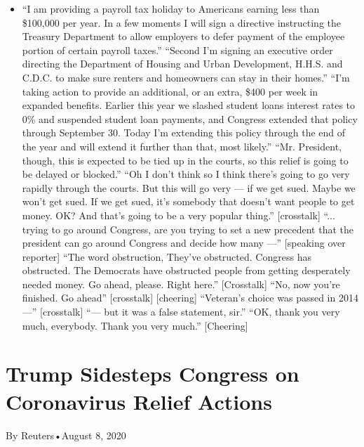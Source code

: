 \begin{itemize}
\tightlist
\item
  ``I am providing a payroll tax holiday to Americans earning less than
  \$100,000 per year. In a few moments I will sign a directive
  instructing the Treasury Department to allow employers to defer
  payment of the employee portion of certain payroll taxes.'' ``Second
  I'm signing an executive order directing the Department of Housing and
  Urban Development, H.H.S. and C.D.C. to make sure renters and
  homeowners can stay in their homes.'' ``I'm taking action to provide
  an additional, or an extra, \$400 per week in expanded benefits.
  Earlier this year we slashed student loans interest rates to 0\% and
  suspended student loan payments, and Congress extended that policy
  through September 30. Today I'm extending this policy through the end
  of the year and will extend it further than that, most likely.'' ``Mr.
  President, though, this is expected to be tied up in the courts, so
  this relief is going to be delayed or blocked.'' ``Oh I don't think so
  I think there's going to go very rapidly through the courts. But this
  will go very --- if we get sued. Maybe we won't get sued. If we get
  sued, it's somebody that doesn't want people to get money. OK? And
  that's going to be a very popular thing.'' {[}crosstalk{]} ``...
  trying to go around Congress, are you trying to set a new precedent
  that the president can go around Congress and decide how many ---''
  {[}speaking over reporter{]} ``The word obstruction, They've
  obstructed. Congress has obstructed. The Democrats have obstructed
  people from getting desperately needed money. Go ahead, please. Right
  here.'' {[}Crosstalk{]} ``No, now you're finished. Go ahead''
  {[}crosstalk{]} {[}cheering{]} ``Veteran's choice was passed in
  2014---'' {[}crosstalk{]} ``--- but it was a false statement, sir.''
  ``OK, thank you very much, everybody. Thank you very much.''
  {[}Cheering{]}
\end{itemize}

\hypertarget{trump-sidesteps-congress-on-coronavirus-relief-actions-1}{%
\section{Trump Sidesteps Congress on Coronavirus Relief
Actions}\label{trump-sidesteps-congress-on-coronavirus-relief-actions-1}}

By Reuters•August 8, 2020

